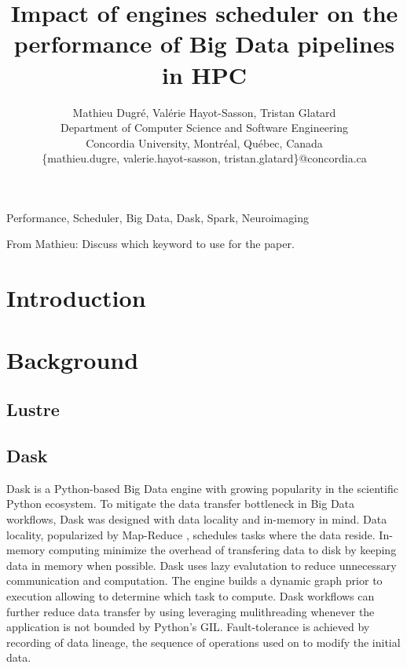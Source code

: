 \documentclass[conference]{IEEEtran}
\newcommand{\MD}[1]{\color{magenta}From Mathieu: #1 \color{black}}
\begin{document}
\title{Impact of engines scheduler on the performance of Big Data pipelines in HPC}

\author{Mathieu Dugr\'e, Val\'erie Hayot-Sasson, Tristan Glatard\\
	Department of Computer Science and Software Engineering\\
	Concordia University, Montr\'eal, Qu\'ebec, Canada\\
	\{mathieu.dugre, valerie.hayot-sasson, tristan.glatard\}@concordia.ca
	\vspace*{0.8cm} %
}

\maketitle

\begin{abstract}
\end{abstract}

\begin{IEEEkeywords}
	Performance, Scheduler, Big Data, Dask, Spark, Neuroimaging
\end{IEEEkeywords}
\MD{Discuss which keyword to use for the paper.}

\section{Introduction}

\section{Background}
\subsection{Lustre} %

\subsection{Dask}
Dask is a Python-based Big Data engine with growing popularity in the scientific Python ecosystem.
To mitigate the data transfer bottleneck in Big Data workflows, Dask was designed with data locality and in-memory in mind.
Data locality, popularized by Map-Reduce \cite{dean2008mapreduce}, schedules tasks where the data reside.
In-memory computing minimize the overhead of transfering data to disk by keeping data in memory when possible.
Dask uses lazy evalutation to reduce unnecessary communication and computation.
The engine builds a dynamic graph prior to execution allowing to determine which task to compute.
Dask workflows can further reduce data transfer by using  leveraging mulithreading whenever the application is not bounded by Python's GIL.
Fault-tolerance is achieved by recording of data lineage, the sequence of operations used on to modify the initial data.
\end{document}
